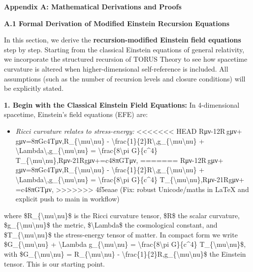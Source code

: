 \documentclass[]{article}
\date{}
\begin{document}
\textbf{Appendix A: Mathematical Derivations and Proofs}

\textbf{A.1 Formal Derivation of Modified Einstein Recursion Equations}

In this section, we derive the \textbf{recursion-modified Einstein field
equations} step by step. Starting from the classical Einstein equations
of general relativity, we incorporate the structured recursion of TORUS
Theory to see how spacetime curvature is altered when higher-dimensional
self-reference is included. All assumptions (such as the number of
recursion levels and closure conditions) will be explicitly stated.

\textbf{1. Begin with the Classical Einstein Field Equations:} In
4-dimensional spacetime, Einstein's field equations (EFE) are:

\begin{itemize}
\item
  \emph{Ricci curvature relates to stress-energy:}
<<<<<<< HEAD
  Rμν-12R gμν+\Lambda gμν=8πGc4Tμν,R\_\{\textbackslash mu\textbackslash nu\} -
  \textbackslash frac\{1\}\{2\}R\textbackslash,g\_\{\textbackslash mu\textbackslash nu\}
  +
  \textbackslash Lambda\textbackslash,g\_\{\textbackslash mu\textbackslash nu\}
  = \textbackslash frac\{8\textbackslash pi G\}\{c\^{}4\}
  T\_\{\textbackslash mu\textbackslash nu\},Rμν\hspace{0pt}-21\hspace{0pt}Rgμν\hspace{0pt}+\hspace{0pt}=c48πG\hspace{0pt}Tμν\hspace{0pt},
=======
  Rμν-12R gμν+\Lambda gμν=8πGc4Tμν,R\_\{\textbackslash{}mu\textbackslash{}nu\}
  -
  \textbackslash{}frac\{1\}\{2\}R\textbackslash{},g\_\{\textbackslash{}mu\textbackslash{}nu\}
  +
  \textbackslash{}Lambda\textbackslash{},g\_\{\textbackslash{}mu\textbackslash{}nu\}
  = \textbackslash{}frac\{8\textbackslash{}pi G\}\{c\^{}4\}
  T\_\{\textbackslash{}mu\textbackslash{}nu\},Rμν​-21​Rgμν​+​=c48πG​Tμν​,
>>>>>>> 4f5eaae (Fix: robust Unicode/maths in LaTeX and explicit push to main in workflow)
\end{itemize}

where \$R\_\{\textbackslash{}mu\textbackslash{}nu\}\$ is the Ricci
curvature tensor, \$R\$ the scalar curvature,
\$g\_\{\textbackslash{}mu\textbackslash{}nu\}\$ the metric,
\$\textbackslash{}Lambda\$ the cosmological constant, and
\$T\_\{\textbackslash{}mu\textbackslash{}nu\}\$ the stress-energy tensor
of matter. In compact form we write
\$G\_\{\textbackslash{}mu\textbackslash{}nu\} + \textbackslash{}Lambda
g\_\{\textbackslash{}mu\textbackslash{}nu\} =
\textbackslash{}frac\{8\textbackslash{}pi G\}\{c\^{}4\}
T\_\{\textbackslash{}mu\textbackslash{}nu\}\$, with
\$G\_\{\textbackslash{}mu\textbackslash{}nu\} =
R\_\{\textbackslash{}mu\textbackslash{}nu\} -
\textbackslash{}frac\{1\}\{2\}R,g\_\{\textbackslash{}mu\textbackslash{}nu\}\$
the Einstein tensor. This is our starting point​.
\end{document}
